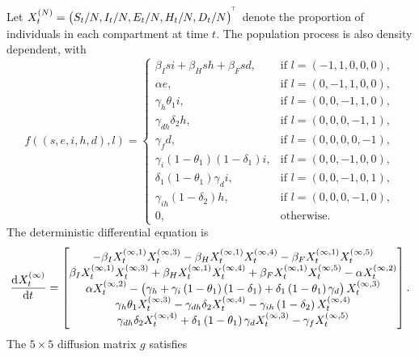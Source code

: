 Let \(X_t^{(N)} = \left(S_t / N, I_t / N, E_t / N, H_t / N, D_t / N\right)^{^{\!\top}}\) denote the proportion of individuals in each compartment at time \(t\).
The population process is also density dependent, with
\[
	f\!\left(\left(s, e, i, h, d\right), l\right) = \begin{cases}
		\beta_I s i + \beta_H sh + \beta_F sd,                        & \text{if } l = \left(-1, 1, 0, 0, 0\right), \\
		\alpha e,                                                     & \text{if } l = \left(0, -1, 1, 0, 0\right), \\
		\gamma_h \theta_1 i,                                          & \text{if } l = \left(0, 0, -1, 1, 0\right), \\
		\gamma_{dh}\delta_2 h,                                        & \text{if } l = \left(0, 0, 0, -1, 1\right), \\
		\gamma_f d,                                                   & \text{if } l = \left(0, 0, 0, 0, -1\right), \\
		\gamma_i\left(1 - \theta_1\right)\left(1 - \delta_1\right) i, & \text{if } l = \left(0,0,-1,0,0\right),     \\
		\delta_1\left(1 - \theta_1\right)\gamma_d i,                  & \text{if } l = \left(0,0,-1,0,1\right),     \\
		\gamma_{ih}\left(1 - \delta_2\right)h,                        & \text{if } l = \left(0,0,0,-1,0\right),     \\
		0,                                                            & \text{otherwise}.
	\end{cases}
\]
The deterministic differential equation is
\[
	\dod{X_t^{(\infty)}}{t} = \begin{bmatrix}
		-\beta_I X_t^{(\infty, 1)}X_t^{(\infty, 3)} - \beta_H X_t^{(\infty, 1)}X_t^{(\infty, 4)} - \beta_F X_t^{(\infty, 1)}X_t^{(\infty,5)}                                        \\
		\beta_I X_t^{(\infty, 1)}X_t^{(\infty, 3)} + \beta_H X_t^{(\infty, 1)}X_t^{(\infty, 4)} + \beta_F X_t^{(\infty, 1)}X_t^{(\infty,5)} - \alpha X_t^{(\infty, 2)}              \\
		\alpha X_t^{(\infty, 2)} - \left(\gamma_h + \gamma_i\left(1 - \theta_1\right)\left(1 - \delta_1\right) + \delta_1\left(1 - \theta_1\right)\gamma_d\right) X_t^{(\infty, 3)} \\
		\gamma_h\theta_1 X_t^{(\infty, 3)} - \gamma_{dh}\delta_2 X_t^{(\infty, 4)} - \gamma_{ih}\left(1 - \delta_2\right)X_t^{(\infty,4)}                                           \\
		\gamma_{dh}\delta_2 X_t^{(\infty, 4)} + \delta_1\left(1 - \theta_1\right)\gamma_d X_t^{(\infty, 3)} - \gamma_f X_t^{(\infty, 5)}
	\end{bmatrix}.
\]
The \(5\times 5\) diffusion matrix \(g\) satisfies

